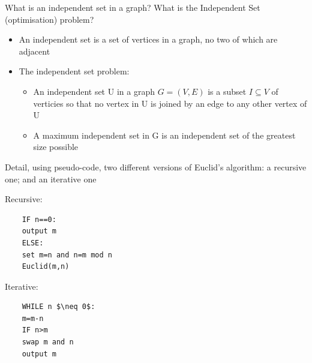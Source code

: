 \documentclass[addpoints]{exam}
\begin{document}
\begin{questions}
\question[3]What is an independent set in a graph? What is the Independent Set
(optimisation) problem?
\begin{solution}[2in]
	\begin{itemize}
		\item An independent set is a set of vertices in a graph, no two of which are adjacent
		\item The independent set problem:
		\begin{itemize}
			\item An independent set U in a graph $G=(V,E)$ is a subset $I\subseteq V$ of verticies so that no vertex in U is joined by an edge to any other vertex of U
			\item A maximum independent set in G is an independent set of the greatest size possible
		\end{itemize}
	\end{itemize}	
\end{solution}

	\question[6]Detail, using pseudo-code, two different versions of Euclid's algorithm: a recursive one; and an iterative one
\begin{solution}[2in]
	Recursive:\\
	\begin{lstlisting}
	IF n==0:
	output m
	ELSE:
	set m=n and n=m mod n
	Euclid(m,n)
	\end{lstlisting}
	Iterative:
	\begin{lstlisting}
	WHILE n $\neq 0$:
	m=m-n
	IF n>m
	swap m and n
	output m
	\end{lstlisting}
\end{solution}


\end{questions}
\end{document}
